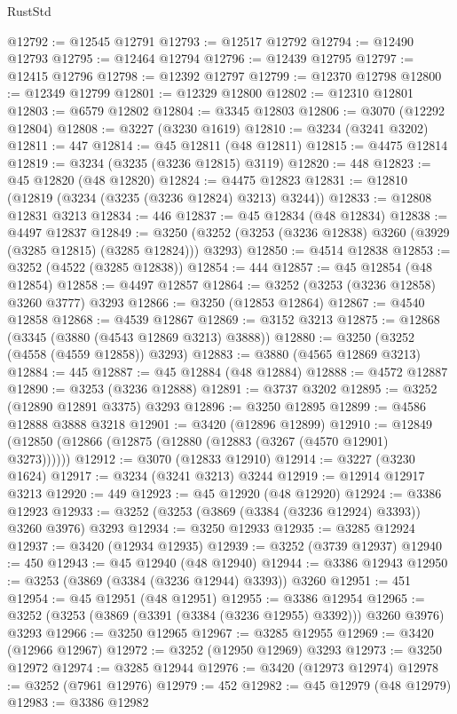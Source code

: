 \begin{lexlean}{RustStd}
\begin{coremodule}
{\begin{coremodule}
{{{{{{{{{{{{{{{{{{{{{{{{{{{{{{{{{{{{{{{@12792 := @12545 @12791
@12793 := @12517 @12792
@12794 := @12490 @12793
@12795 := @12464 @12794
@12796 := @12439 @12795
@12797 := @12415 @12796
@12798 := @12392 @12797
@12799 := @12370 @12798
@12800 := @12349 @12799
@12801 := @12329 @12800
@12802 := @12310 @12801
@12803 := @6579 @12802
@12804 := @3345 @12803
@12806 := @3070 (@12292 @12804)
@12808 := @3227 (@3230 @1619)
@12810 := @3234 (@3241 @3202)
@12811 := 447
@12814 := @45 @12811 (@48 @12811)
@12815 := @4475 @12814
@12819 := @3234 (@3235 (@3236 @12815) @3119)
@12820 := 448
@12823 := @45 @12820 (@48 @12820)
@12824 := @4475 @12823
@12831 := @12810 (@12819 (@3234 (@3235 (@3236 @12824) @3213) @3244))
@12833 := @12808 @12831 @3213
@12834 := 446
@12837 := @45 @12834 (@48 @12834)
@12838 := @4497 @12837
@12849 := @3250 (@3252 (@3253 (@3236 @12838) @3260 (@3929 (@3285 @12815) (@3285 @12824))) @3293)
@12850 := @4514 @12838
@12853 := @3252 (@4522 (@3285 @12838))
@12854 := 444
@12857 := @45 @12854 (@48 @12854)
@12858 := @4497 @12857
@12864 := @3252 (@3253 (@3236 @12858) @3260 @3777) @3293
@12866 := @3250 (@12853 @12864)
@12867 := @4540 @12858
@12868 := @4539 @12867
@12869 := @3152 @3213
@12875 := @12868 (@3345 (@3880 (@4543 @12869 @3213) @3888))
@12880 := @3250 (@3252 (@4558 (@4559 @12858)) @3293)
@12883 := @3880 (@4565 @12869 @3213)
@12884 := 445
@12887 := @45 @12884 (@48 @12884)
@12888 := @4572 @12887
@12890 := @3253 (@3236 @12888)
@12891 := @3737 @3202
@12895 := @3252 (@12890 @12891 @3375) @3293
@12896 := @3250 @12895
@12899 := @4586 @12888 @3888 @3218
@12901 := @3420 (@12896 @12899)
@12910 := @12849 (@12850 (@12866 (@12875 (@12880 (@12883 (@3267 (@4570 @12901) @3273))))))
@12912 := @3070 (@12833 @12910)
@12914 := @3227 (@3230 @1624)
@12917 := @3234 (@3241 @3213) @3244
@12919 := @12914 @12917 @3213
@12920 := 449
@12923 := @45 @12920 (@48 @12920)
@12924 := @3386 @12923
@12933 := @3252 (@3253 (@3869 (@3384 (@3236 @12924) @3393)) @3260 @3976) @3293
@12934 := @3250 @12933
@12935 := @3285 @12924
@12937 := @3420 (@12934 @12935)
@12939 := @3252 (@3739 @12937)
@12940 := 450
@12943 := @45 @12940 (@48 @12940)
@12944 := @3386 @12943
@12950 := @3253 (@3869 (@3384 (@3236 @12944) @3393)) @3260
@12951 := 451
@12954 := @45 @12951 (@48 @12951)
@12955 := @3386 @12954
@12965 := @3252 (@3253 (@3869 (@3391 (@3384 (@3236 @12955) @3392))) @3260 @3976) @3293
@12966 := @3250 @12965
@12967 := @3285 @12955
@12969 := @3420 (@12966 @12967)
@12972 := @3252 (@12950 @12969) @3293
@12973 := @3250 @12972
@12974 := @3285 @12944
@12976 := @3420 (@12973 @12974)
@12978 := @3252 (@7961 @12976)
@12979 := 452
@12982 := @45 @12979 (@48 @12979)
@12983 := @3386 @12982
}}}}}}}}}}}}}}}}}}}}}}}}}}}}}}}}}}}}}}}
\end{coremodule}}
\end{coremodule}
\end{lexlean}
